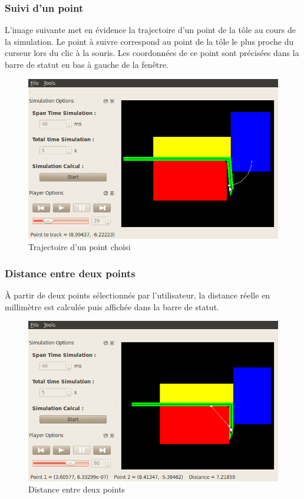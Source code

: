 \documentclass[a4paper, 11pt]{article}
\begin{document}
\subsubsection{Suivi d'un point}
L'image suivante met en évidence la trajectoire d'un point de la tôle au cours de la simulation.
Le point à suivre correspond au point de la tôle le plus proche du curseur lors du clic à la souris.
Les coordonnées de ce point sont précisées dans la barre de statut en bas à gauche de la fenêtre.
\begin{figure}[H]
    \begin{center}
        \includegraphics[width=.8\textwidth]{img/tracking.png}
    \end{center}
    \caption{Trajectoire d'un point choisi}
\end{figure}

\subsubsection{Distance entre deux points}
À partir de deux points sélectionnés par l'utilisateur, la distance réelle en millimètre est calculée puis affichée dans la barre de statut.
\begin{figure}[H]
    \begin{center}
        \includegraphics[width=.8\textwidth]{img/distance.png}
    \end{center}
    \caption{Distance entre deux points}
\end{figure}
\end{document}
